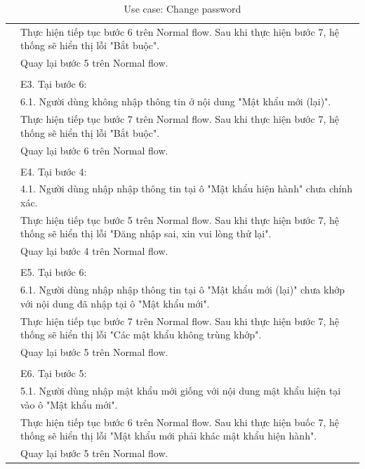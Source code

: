 \documentclass[a4paper, 12pt]{article}
\begin{document}
\begin{table}[H]
\begin{tabular}{|l|p{11cm}|}
        & Thực hiện tiếp tục bước 6 trên Normal flow. Sau khi thực hiện bước 7, hệ thống sẽ hiển thị lỗi "Bắt buộc". \\
        & Quay lại bước 5 trên Normal flow. \\
        & \\
        & E3. Tại bước 6: \\
        & 6.1. Người dùng không nhập thông tin ở nội dung "Mật khẩu mới (lại)". \\
        & Thực hiện tiếp tục bước 7 trên Normal flow. Sau khi thực hiện bước 7, hệ thống sẽ hiển thị lỗi "Bắt buộc". \\
        & Quay lại bước 6 trên Normal flow. \\
        & \\
        & E4. Tại bước 4: \\
        & 4.1. Người dùng nhập nhập thông tin tại ô "Mật khẩu hiện hành" chưa chính xác. \\
        & Thực hiện tiếp tục bước 5 trên Normal flow. Sau khi thực hiện bước 7, hệ thống sẽ hiển thị lỗi "Đăng nhập sai, xin vui lòng thử lại". \\
        & Quay lại bước 4 trên Normal flow. \\
        & \\
        & E5. Tại bước 6: \\
        & 6.1. Người dùng nhập nhập thông tin tại ô "Mật khẩu mới (lại)" chưa khớp với nội dung đã nhập tại ô "Mật khẩu mới". \\
        & Thực hiện tiếp tục bước 7 trên Normal flow. Sau khi thực hiện bước 7, hệ thống sẽ hiển thị lỗi "Các mật khẩu không trùng khớp". \\
        & Quay lại bước 5 trên Normal flow. \\
        & \\
        & E6. Tại bước 5: \\
        & 5.1. Người dùng nhập mật khẩu mới giống với nội dung mật khẩu hiện tại vào ô "Mật khẩu mới". \\
        & Thực hiện tiếp tục bước 6 trên Normal flow. Sau khi thực hiện buốc 7, hệ thống sẽ hiển thị lỗi "Mật khẩu mới phải khác mật khẩu hiện hành". \\
        & Quay lại bước 5 trên Normal flow. \\
        \hline
    \end{tabular}
    \caption{Use case: Change password}
    \label{Use case: Change password}
\end{table}
\end{document}
